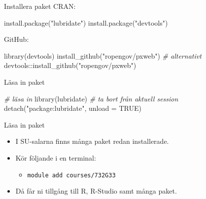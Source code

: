 \documentclass[
  11pt,
  ignorenonframetext,
]{beamer}
\newenvironment{Shaded}{\begin{snugshade}}{\end{snugshade}}
\newcommand{\AttributeTok}[1]{\textcolor[rgb]{0.77,0.63,0.00}{#1}}
\newcommand{\CommentTok}[1]{\textcolor[rgb]{0.56,0.35,0.01}{\textit{#1}}}
\newcommand{\ConstantTok}[1]{\textcolor[rgb]{0.00,0.00,0.00}{#1}}
\newcommand{\FunctionTok}[1]{\textcolor[rgb]{0.00,0.00,0.00}{#1}}
\newcommand{\NormalTok}[1]{#1}
\newcommand{\SpecialCharTok}[1]{\textcolor[rgb]{0.00,0.00,0.00}{#1}}
\newcommand{\StringTok}[1]{\textcolor[rgb]{0.31,0.60,0.02}{#1}}
\providecommand{\tightlist}{%
  \setlength{\itemsep}{0pt}\setlength{\parskip}{0pt}}
\begin{document}
\begin{frame}[fragile]{Installera paket}
\protect\hypertarget{installera-paket}{}
CRAN:

\begin{Shaded}
\begin{Highlighting}[]
\FunctionTok{install.package}\NormalTok{(}\StringTok{"lubridate"}\NormalTok{)}
\FunctionTok{install.package}\NormalTok{(}\StringTok{"devtools"}\NormalTok{)}
\end{Highlighting}
\end{Shaded}

GitHub:

\begin{Shaded}
\begin{Highlighting}[]
\FunctionTok{library}\NormalTok{(devtools)}
\FunctionTok{install\_github}\NormalTok{(}\StringTok{"ropengov/pxweb"}\NormalTok{)}
\CommentTok{\# alternativt}
\NormalTok{devtools}\SpecialCharTok{::}\FunctionTok{install\_github}\NormalTok{(}\StringTok{"ropengov/pxweb"}\NormalTok{)}
\end{Highlighting}
\end{Shaded}
\end{frame}

\begin{frame}[fragile]{Läsa in paket}
\protect\hypertarget{luxe4sa-in-paket}{}
\begin{Shaded}
\begin{Highlighting}[]
\CommentTok{\# läsa in}
\FunctionTok{library}\NormalTok{(lubridate)}
\CommentTok{\# ta bort från aktuell session}
\FunctionTok{detach}\NormalTok{(}\StringTok{"package:lubridate"}\NormalTok{, }\AttributeTok{unload =} \ConstantTok{TRUE}\NormalTok{)}
\end{Highlighting}
\end{Shaded}
\end{frame}

\begin{frame}{Läsa in paket}
\protect\hypertarget{luxe4sa-in-paket-1}{}
\begin{itemize}
\tightlist
\item
  I SU-salarna finns många paket redan installerade.
\item
  Kör följande i en terminal:

  \begin{itemize}
  \tightlist
  \item 
    \texttt{module add courses/732G33}
  \end{itemize}
\item
  Då får ni tillgång till R, R-Studio samt många paket.
\end{itemize}
\end{frame}
\end{document}

